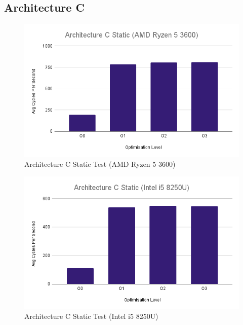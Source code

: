 \documentclass{article}
\begin{document}
\subsection{Architecture C}
\begin{figure}[!h]
\centering
\includegraphics[scale=0.5]{Architecture C Static (AMD Ryzen 5 3600).png}
\caption{Architecture C Static Test (AMD Ryzen 5 3600)}
\label{arch_c_static_pc}
\end{figure}

\begin{figure}[!h]
\centering
\includegraphics[scale=0.5]{Architecture C Static (Intel i5 8250U).png}
\caption{Architecture C Static Test (Intel i5 8250U)}
\label{arch_c_static_laptop}
\end{figure}
\end{document}
